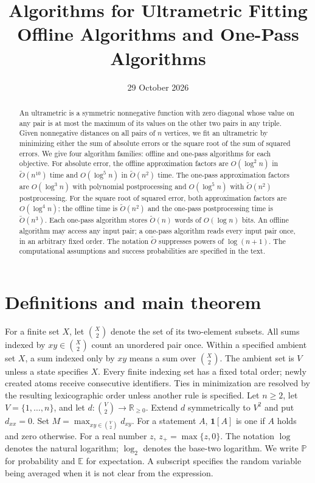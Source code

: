 \documentclass[11pt]{article}
\title{Algorithms for Ultrametric Fitting\\
\large Offline Algorithms and One-Pass Algorithms}
\author{}
\date{29 October 2026}
\theoremstyle{definition}
\newcommand{\E}{\mathbb E}
\newcommand{\Prb}{\mathbb P}
\newcommand{\ind}{\mathbf 1}
\begin{document}
\maketitle

\begin{abstract}
An ultrametric is a symmetric nonnegative function with zero diagonal whose value on any pair
is at most the maximum of its values on the other two pairs in any triple.
Given nonnegative distances on all pairs of $n$ vertices, we fit an
ultrametric by minimizing either the sum of absolute errors or the square
root of the sum of squared errors. We give four algorithm families:
offline and one-pass algorithms for each objective. For absolute error,
the offline approximation factors are $O(\log^2 n)$ in
$\widetilde O(n^{10})$ time and $O(\log^5 n)$ in
$\widetilde O(n^2)$ time. The one-pass approximation factors are
$O(\log^3 n)$ with polynomial postprocessing and $O(\log^5 n)$ with
$\widetilde O(n^2)$ postprocessing. For the square root of squared error,
both approximation factors are $O(\log^4 n)$; the offline time is
$\widetilde O(n^2)$ and the one-pass postprocessing time is
$\widetilde O(n^3)$. Each one-pass algorithm stores
$\widetilde O(n)$ words of $O(\log n)$ bits. An offline algorithm may
access any input pair; a one-pass algorithm reads every input pair once,
in an arbitrary fixed order. The notation $\widetilde O$ suppresses powers
of $\log(n+1)$. The computational
assumptions and success probabilities are specified in the text.
\end{abstract}

\section{Definitions and main theorem}
\label{sec:definitions}

For a finite set $X$, let $\binom X2$ denote the set of its two-element
subsets. All sums indexed by $xy\in\binom X2$ count an unordered pair once.
Within a specified ambient set $X$, a sum indexed only by $xy$ means a
sum over $\binom X2$. The ambient set is $V$ unless a state specifies $X$. Every finite indexing set has a fixed total order; newly created atoms receive consecutive identifiers. Ties in minimization are resolved by the resulting lexicographic order unless another rule is specified.
Let $n\ge2$, let $V=\{1,\ldots,n\}$, and let
$d:\binom V2\to\mathbb R_{\ge0}$. Extend $d$ symmetrically to $V^2$ and
put $d_{xx}=0$. Set $M=\max_{xy\in\binom V2}d_{xy}$.
For a statement $A$, $\ind[A]$ is one if $A$ holds and zero otherwise.
For a real number $z$, $z_+=\max\{z,0\}$.
The notation $\log$ denotes the natural logarithm; $\log_2$ denotes the
base-two logarithm. We write $\Prb$ for probability and $\E$ for
expectation. A subscript specifies the random variable being averaged
when it is not clear from the expression.
\end{document}
